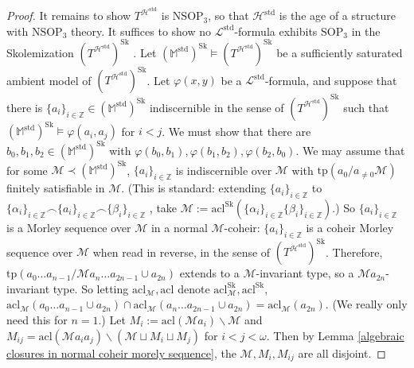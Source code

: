 \documentclass{amsart}
\theoremstyle{definition}
\theoremstyle{remark}
\numberwithin{equation}{section}
\begin{document}
\begin{proof}
     It remains to show $T^{\mathcal{H}^{\mathrm{std}}}$  is $\mathrm{NSOP}_{3}$, so that $\mathcal{H}^{\mathrm{std}}$ is the age of a structure with $\mathrm{NSOP}_{3}$ theory. It suffices to show no $\mathcal{L}^{\mathrm{std}}$-formula exhibits $\mathrm{SOP}_{3}$ in the Skolemization $(T^{\mathcal{H}^{\mathrm{std}}})^{\mathrm{Sk}}$ .  Let $(\mathbb{M}^{\mathrm{std}})^{\mathrm{Sk}} \models (T^{\mathcal{H}^{\mathrm{std}}})^{\mathrm{Sk}}$ be a sufficiently saturated ambient model of $(T^{\mathcal{H}^{\mathrm{std}}})^{\mathrm{Sk}}$. Let $\varphi(x, y)$ be a $\mathcal{L}^{\mathrm{std}}$-formula, and suppose that there is $\{a_{i}\}_{i \in \mathbb{Z}} \in (\mathbb{M}^{\mathrm{std}})^{\mathrm{Sk}}$ indiscernible in the sense of $(T^{\mathcal{H}^{\mathrm{std}}})^{\mathrm{Sk}}$ such that $(\mathbb{M}^{\mathrm{std}})^{\mathrm{Sk}} \models \varphi(a_{i}, a_{j}) $ for $i < j$. We must show that there are $b_0, b_1, b_2 \in (\mathbb{M}^{\mathrm{std}})^{\mathrm{Sk}}$ with $\varphi(b_0, b_1),\varphi(b_1, b_2), \varphi(b_2, b_0) $. We may assume that for some $\mathcal{M} \prec (\mathbb{M}^{\mathrm{std}})^{\mathrm{Sk}}$, $\{a_{i}\}_{i \in \mathbb{Z}}$ is indiscernible over $\mathcal{M}$ with $\mathrm{tp}(a_{0}/a_{\neq 0} \mathcal{M})$ finitely satisfiable in $\mathcal{M}$. (This is standard: extending $\{a_{i}\}_{i \in \mathbb{Z}}$ to $\{\alpha_{i}\}_{i \in \mathbb{Z}} \smallfrown \{a_{i}\}_{i \in \mathbb{Z}} \smallfrown \{\beta_{i}\}_{i \in \mathbb{Z}}$ , take $\mathcal{M} := \mathrm{acl}^{\mathrm{Sk}}(\{\alpha_i\}_{i \in \mathbb{Z}}\{\beta_i\}_{i \in \mathbb{Z}})$.) So $\{a_{i}\}_{i \in \mathbb{Z}}$ is a Morley sequence over $\mathcal{M}$ in a normal $\mathcal{M}$-coheir: $\{a_{i}\}_{i \in \mathbb{Z}}$ is a coheir Morley sequence over $\mathcal{M}$ when read in reverse, in the sense of $(T^{\mathcal{H}^{\mathrm{std}}})^{\mathrm{Sk}}$. Therefore, $\mathrm{tp}(a_{0} \ldots a_{n-1} /\mathcal{M} a_{n} \ldots a_{2n-1} \cup a_{2n} )$ extends to a $\mathcal{M}$-invariant type, so a $\mathcal{M} a_{2n}$-invariant type. So letting $\mathrm{acl}_{\mathcal{M}}, \mathrm{acl}$ denote $\mathrm{acl}_{\mathcal{M}}^{\mathrm{Sk}}, \mathrm{acl}^{\mathrm{Sk}}$, $\mathrm{acl}_{\mathcal{M}}(a_{0} \ldots a_{n-1} \cup a_{2n}) \cap \mathrm{acl}_{\mathcal{M}}(a_{n} \ldots a_{2n-1} \cup a_{2n})=\mathrm{acl}_{\mathcal{M}}(a_{2n})$. (We really only need this for $n =1$.) Let $M_{i}:= \mathrm{acl}(\mathcal{M}a_{i})\backslash \mathcal{M}$ and $M_{ij}= \mathrm{acl}(\mathcal{M}a_{i}a_{j}) \backslash (\mathcal{M} \sqcup M_{i} \sqcup M_{j} )$ for $i < j < \omega$. Then by Lemma \ref{algebraic closures in normal coheir morely sequence}, the $\mathcal{M}, M_i, M_{ij}$ are all disjoint.


\end{proof}
\end{document}
